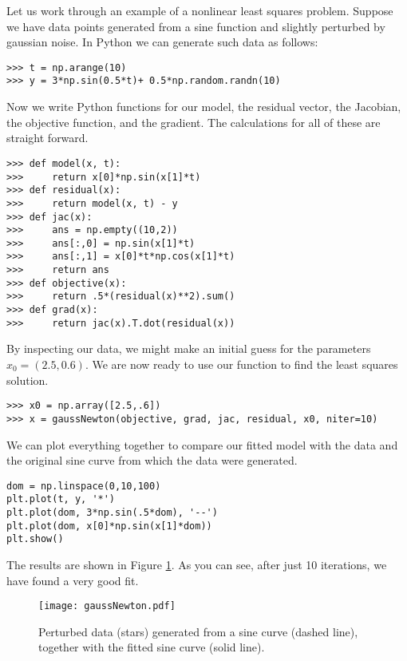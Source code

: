 Let us work through an example of a nonlinear least squares problem. Suppose we have data points
generated from a sine function and slightly perturbed by gaussian noise. In Python we can generate such
data as follows:
\begin{lstlisting}
>>> t = np.arange(10)
>>> y = 3*np.sin(0.5*t)+ 0.5*np.random.randn(10)
\end{lstlisting}
Now we write Python functions for our model, the residual vector, the Jacobian, the objective function,
and the gradient. The calculations for all of these are straight forward.
\begin{lstlisting}
>>> def model(x, t):
>>>     return x[0]*np.sin(x[1]*t)
>>> def residual(x):
>>>     return model(x, t) - y
>>> def jac(x):
>>>     ans = np.empty((10,2))
>>>     ans[:,0] = np.sin(x[1]*t)
>>>     ans[:,1] = x[0]*t*np.cos(x[1]*t)
>>>     return ans
>>> def objective(x):
>>>     return .5*(residual(x)**2).sum()
>>> def grad(x):
>>>     return jac(x).T.dot(residual(x))
\end{lstlisting}
By inspecting our data, we might make an initial guess for the parameters $x_0 = (2.5, 0.6)$.
We are now ready to use our  function to find the least squares solution.
\begin{lstlisting}
>>> x0 = np.array([2.5,.6])
>>> x = gaussNewton(objective, grad, jac, residual, x0, niter=10)
\end{lstlisting}
We can plot everything together to compare our fitted model with the data and the original sine
curve from which the data were generated.
\begin{lstlisting}
dom = np.linspace(0,10,100)
plt.plot(t, y, '*')
plt.plot(dom, 3*np.sin(.5*dom), '--')
plt.plot(dom, x[0]*np.sin(x[1]*dom))
plt.show()
\end{lstlisting}
The results are shown in Figure \ref{linesearch:gaussNewton}. As you can see, after just 10
iterations, we have found a very good fit.
\begin{figure}
\centering
\texttt{[image: gaussNewton.pdf]}
\caption{Perturbed data (stars) generated from a sine curve (dashed line),
together with the fitted sine curve (solid line).
}
\label{linesearch:gaussNewton}
\end{figure}

